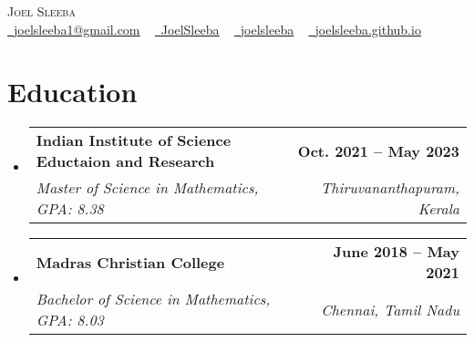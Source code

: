 \documentclass[letterpaper,11pt]{article}
\makeatletter
\newcommand{\resumeSubheading}[4]{
  \vspace{-2pt}\item
    \begin{tabular*}{1.0\textwidth}[t]{l@{\extracolsep{\fill}}r}
      \textbf{#1} & \textbf{\small #2} \\
      \textit{\small#3} & \textit{\small #4} \\
    \end{tabular*}\vspace{-7pt}
}
\newcommand{\resumeSubHeadingListStart}{\begin{itemize}[leftmargin=0.0in, label={}]}
\newcommand{\resumeSubHeadingListEnd}{\end{itemize}}
\makeatother
\begin{document}

\begin{center}
    {\Huge \scshape Joel Sleeba} \\ \vspace{2pt}
    \small \href{mailto:joelsleeba1@gmail.com}{\raisebox{-0.2\height}\faEnvelope\  \ul{joelsleeba1@gmail.com}} ~ 
    \href{https://twitter.com/JoelSleeba/}{\raisebox{-0.2\height}\faTwitter\ \ul{JoelSleeba}}  ~
    \href{https://github.com/joelsleeba}{\raisebox{-0.2\height}\faGithub\ \ul{joelsleeba}} ~
    \href{https://joelsleeba.github.io/}{\raisebox{-0.2\height}\faGlobe\ \ul{joelsleeba.github.io}}

    \vspace{-8pt}
\end{center}


\section{Education}
  \resumeSubHeadingListStart
    \resumeSubheading
      {Indian Institute of Science Eductaion and Research}{Oct. 2021 -- May 2023}
      {Master of Science in Mathematics, GPA: 8.38}{Thiruvananthapuram, Kerala}
  \resumeSubHeadingListEnd
  \vspace{-10pt}
  \resumeSubHeadingListStart
    \resumeSubheading
      {Madras Christian College}{June 2018 -- May 2021}
      {Bachelor of Science in Mathematics, GPA: 8.03}{Chennai, Tamil Nadu}
  \resumeSubHeadingListEnd

\end{document}
